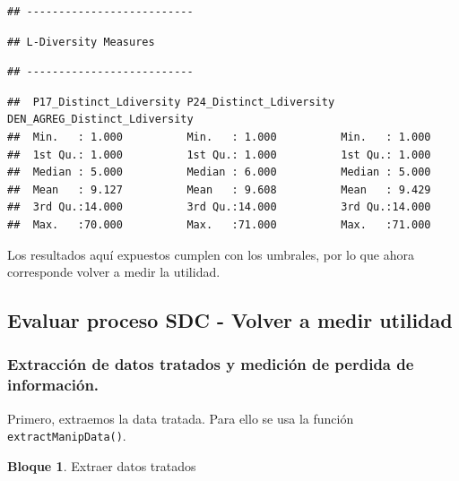 \documentclass[]{book}
\theoremstyle{definition}
\theoremstyle{definition}
\newtheorem{example}{Bloque}[chapter]
\theoremstyle{definition}
\theoremstyle{definition}
\theoremstyle{remark}
\begin{document}
\begin{verbatim}
## --------------------------
\end{verbatim}

\begin{verbatim}
## L-Diversity Measures
\end{verbatim}

\begin{verbatim}
## --------------------------
\end{verbatim}

\begin{verbatim}
##  P17_Distinct_Ldiversity P24_Distinct_Ldiversity DEN_AGREG_Distinct_Ldiversity
##  Min.   : 1.000          Min.   : 1.000          Min.   : 1.000               
##  1st Qu.: 1.000          1st Qu.: 1.000          1st Qu.: 1.000               
##  Median : 5.000          Median : 6.000          Median : 5.000               
##  Mean   : 9.127          Mean   : 9.608          Mean   : 9.429               
##  3rd Qu.:14.000          3rd Qu.:14.000          3rd Qu.:14.000               
##  Max.   :70.000          Max.   :71.000          Max.   :71.000
\end{verbatim}

Los resultados aquí expuestos cumplen con los umbrales, por lo que ahora corresponde volver a medir la utilidad.

\hypertarget{evaluar-proceso-sdc---volver-a-medir-utilidad}{%
\subsection{Evaluar proceso SDC - Volver a medir utilidad}\label{evaluar-proceso-sdc---volver-a-medir-utilidad}}

\hypertarget{extracciuxf3n-de-datos-tratados-y-mediciuxf3n-de-perdida-de-informaciuxf3n.}{%
\subsubsection{Extracción de datos tratados y medición de perdida de información.}\label{extracciuxf3n-de-datos-tratados-y-mediciuxf3n-de-perdida-de-informaciuxf3n.}}

Primero, extraemos la data tratada. Para ello se usa la función \texttt{extractManipData()}.

\begin{example}
\protect\hypertarget{exm:bloque70nbm}{}{\label{exm:bloque70nbm} }Extraer datos tratados
\end{example}
\end{document}
